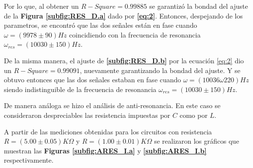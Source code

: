 \documentclass[11pt,a4paper]{article}
\begin{document}
Por lo que, al obtener un $R-Square = 0.99885$ se garantizó la bondad del ajuste de la \textbf{Figura \ref{subfig:RES_D.a}} dado por \textbf{\eqref{eq:2}}. Entonces, despejando de los parametros, se encontró que las dos señales están en fase cuando $\omega = ( 9978 \pm 90) Hz$ coincidiendo con la frecuencia de resonancia $\omega_{res} = (10030 \pm 150) Hz$.

De la misma manera, el ajuste de \textbf{\ref{subfig:RES_D.b}} por la ecuación \eqref{eq:2} dio un $R-Square = 0.99091$, nuevamente garantizando la bondad del ajuste. Y se obtuvo entonces que las dos señales estaban en fase cuando $\omega = (10036 \omega 220) Hz$ siendo indistinguible de la frecuencia de resonancia $\omega_{res} = (10030 \pm 150) Hz$.

\bigskip

De manera análoga se hizo el análisis de anti-resonancia. En este caso se consideraron despreciables las resistencia impuestas por $C$ como por $L$.

A partir de las mediciones obtenidas para los circuitos con resistencia $R=(5.00 \pm 0.05) K\Omega$ y $R=(1.00 \pm 0.01)K\Omega$ se realizaron los gráficos que muestran las \textbf{Figuras \ref{subfig:ARES_I.a}} y \textbf{\ref{subfig:ARES_I.b}} respectivamente.
\end{document}
